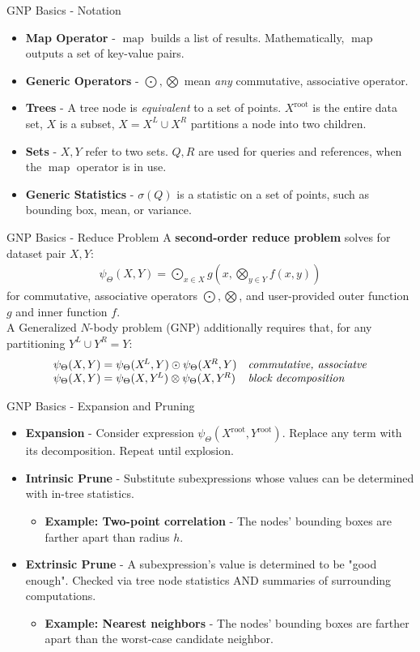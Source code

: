 \documentclass[pdf,colorBG,slideColor]{prosper}
\newcommand{\itemt}[1]{\item {\bf #1} -}
\newcommand{\union}{\cup}
\DeclareMathOperator*{\map}{map}
\newcommand{\gnp}{\psi_{\Theta}}
\newcommand{\defterm}[1]{{\bf #1}}
\newcommand{\kdroot}[1]{#1^{\text{root}}}
\newcommand{\kdleft}[1]{#1^{\!L}}
\newcommand{\kdright}[1]{#1^{\!R}}
\newcommand{\outstat}{\sigma}
\begin{document}
\begin{slide}{GNP Basics - Notation}
  \begin{itemize}
    \itemt{Map Operator} $\map$ builds a list of results.
    Mathematically, $\map$ outputs a set of key-value pairs.
    \itemt{Generic Operators} $\bigodot, \bigotimes$ mean {\em any} commutative, associative operator.
    \itemt{Trees} A tree node is {\em equivalent} to a set of points.
    $\kdroot{X}$ is the entire data set, $X$ is a subset,
    $X = \kdleft{X} \union \kdright{X}$ partitions a node into two children.
    \itemt{Sets} $X, Y$ refer to two sets.  $Q, R$ are used for queries and
    references, when the $\map$ operator is in use.
    \itemt{Generic Statistics} $\outstat(Q)$ is a statistic on a set of points,
    such as bounding box, mean, or variance.
  \end{itemize}
\end{slide}

\begin{slide}{GNP Basics - Reduce Problem}
  A \defterm{second-order reduce problem} solves for dataset pair $X, Y$:
    \[\begin{array}{l}
      \displaystyle \gnp(X, Y) = \bigodot_{x \in X} g\!\left(x, \bigotimes_{y \in Y} f(x, y) \right)
    \end{array}\]
  for commutative, associative operators $\bigodot, \bigotimes$, and user-provided
  outer function $g$ and inner function $f$.
  \\
  A Generalized $N$-body problem (GNP) additionally requires that, for any partitioning $\kdleft{Y} \union \kdright{Y} = Y$:
    \[\begin{array}{ll}
     \gnp(X,Y) = \gnp(\kdleft{X}, Y) \odot \gnp(\kdright{X},Y) & \text{\it commutative, associatve}
     \\
     \gnp(X,Y) = \gnp(X,\kdleft{Y}) \otimes \gnp(X,\kdright{Y}) & \text{\it block decomposition}
    \end{array}\]
\end{slide}


\begin{slide}{GNP Basics - Expansion and Pruning}
  \begin{itemize}
    \itemt{Expansion}
    Consider expression $\gnp(\kdroot{X}, \kdroot{Y})$.
    Replace any term with its decomposition.
    Repeat until explosion.
    \itemt{Intrinsic Prune}
    Substitute subexpressions whose values can be determined with
    in-tree statistics.
    \begin{itemize}
      \itemt{Example: Two-point correlation} The nodes' bounding boxes are
      farther apart than radius $h$.
    \end{itemize}
    \itemt{Extrinsic Prune}
    A subexpression's value is determined to be "good enough".
    Checked via tree node statistics AND summaries of surrounding computations.
    \begin{itemize}
      \itemt{Example: Nearest neighbors}
      The nodes' bounding boxes are farther apart than the
      worst-case candidate neighbor.
    \end{itemize}
  \end{itemize}
\end{slide}
\end{document}
